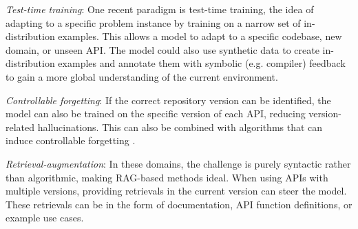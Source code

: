 \textit{Test-time training}: One recent paradigm is test-time training, the idea of adapting to a specific problem instance by training on a narrow set of in-distribution examples. This allows a model to adapt to a specific codebase, new domain, or unseen API. The model could also use synthetic data to create in-distribution examples and annotate them with symbolic (e.g. compiler) feedback to gain a more global understanding of the current environment.

\textit{Controllable forgetting}: If the correct repository version can be identified, the model can also be trained on the specific version of each API, reducing version-related hallucinations. This can also be combined with algorithms that can induce controllable forgetting \citep{wu2024continual}. 

\textit{Retrieval-augmentation}: In these domains, the challenge is purely syntactic rather than algorithmic, making RAG-based methods ideal. When using APIs with multiple versions, providing retrievals in the current version can steer the model. These retrievals can be in the form of documentation, API function definitions, or example use cases. 

